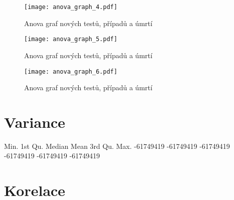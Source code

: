\documentclass[a4paper]{ article}
\begin{document}
\begin{figure}[H]
\centering

\texttt{[image: anova\_graph\_4.pdf]}
\caption{Anova graf nových testů, případů a úmrtí}

\texttt{[image: anova\_graph\_5.pdf]}
\caption{Anova graf nových testů, případů a úmrtí}

\end{figure}

\begin{figure}[H]
\centering

\texttt{[image: anova\_graph\_6.pdf]}
\caption{Anova graf nových testů, případů a úmrtí}

\end{figure}

\clearpage
\section{Variance}
\begin{Schunk}
\begin{Soutput}
     Min.   1st Qu.    Median      Mean   3rd Qu.      Max. 
-61749419 -61749419 -61749419 -61749419 -61749419 -61749419 
\end{Soutput}
\end{Schunk}

\section{Korelace}
\end{document}
